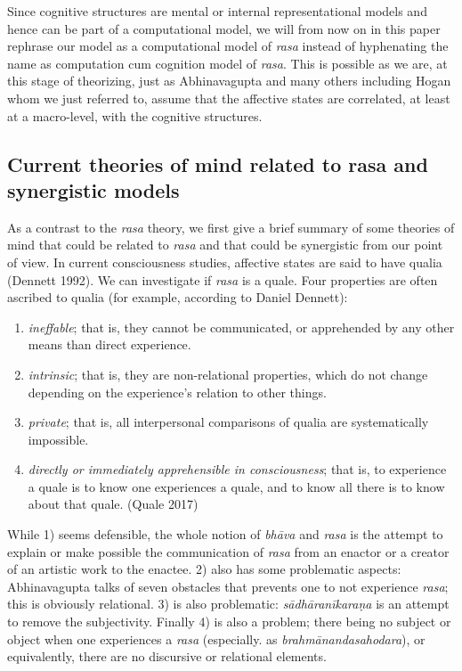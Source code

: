 Since cognitive structures are mental or internal representational models and hence can be part of a computational model, we will from now on in this paper rephrase our model as a computational model of \textsl{rasa} instead of hyphenating the name as computation cum cognition model of \textsl{rasa}. This is possible as we are, at this stage of theorizing, just as Abhinavagupta and many others including Hogan whom we just referred to, assume that the affective states are correlated, at least at a macro-level, with the cognitive structures.

\subsection{Current theories of mind related to rasa and synergistic models}\label{chap3-sec3.1}

As a contrast to the \textsl{rasa} theory, we first give a brief summary of some theories of mind that could be related to \textsl{rasa} and that could be synergistic from our point of view. In current consciousness studies, affective states are said to have qualia (Dennett 1992). We can investigate if \textsl{rasa} is a quale. Four properties are often ascribed to qualia (for example, according to Daniel Dennett): 
\begin{enumerate}
\item \textsl{ineffable}; that is, they cannot be communicated, or apprehended by any other means than direct experience.
\item \textsl{intrinsic}; that is, they are non-relational properties, which do not change depending on the experience's relation to other things.
\item \textsl{private}; that is, all interpersonal comparisons of qualia are systematically impossible.
\item  \textsl{directly or immediately apprehensible in consciousness}; that is, to experience a quale is to know one experiences a quale, and to know all there is to know about that quale. (Quale 2017)
\end{enumerate}

While 1) seems defensible, the whole notion of \textsl{bhāva} and \textsl{rasa} is the attempt to explain or make possible the communication of \textsl{rasa} from an enactor or a creator of an artistic work to the enactee. 2) also has some problematic aspects: Abhinavagupta talks of seven obstacles that prevents one to not experience \textsl{rasa}; this is obviously relational. 3) is also problematic: \textsl{sādhāranīkaraṇa} is an attempt to remove the subjectivity. Finally 4) is also a problem; there being no subject or object when one experiences a \textsl{rasa} (especially. as \textsl{brahmānandasahodara}), or equivalently, there are no discursive or relational elements.

